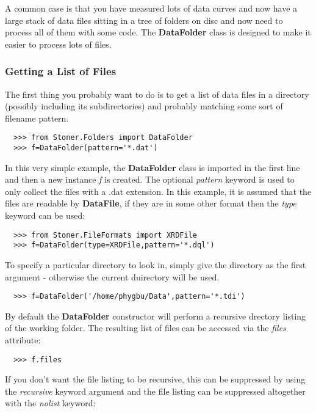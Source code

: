 \documentclass[a4paper,11pt]{scrartcl}
\begin{document}
A common case is that you have measured lots of data curves and now have a large stack of data files sitting in a tree of folders on disc and now need to process all of them with some code. The \textbf{DataFolder} class is designed to make it easier to process lots of files.

\subsubsection{Getting a List of Files}

The first thing you probably want to do is to get a list of data files in a directory (possibly including its subdirectories) and probably matching some sort of filename pattern.

\begin{verbatim}
  >>> from Stoner.Folders import DataFolder
  >>> f=DataFolder(pattern='*.dat')
\end{verbatim}

In this very simple example, the \textbf{DataFolder} class is imported in the first line and then a new instance \textit{f} is created. The optional \textit{pattern} keyword is used to only collect the files with a .dat extension. In this example, it is assumed that the files are readable by \textbf{DataFile}, if they are in some other format then the \textit{type} keyword can be used:

\begin{verbatim}
  >>> from Stoner.FileFormats import XRDFile
  >>> f=DataFolder(type=XRDFile,pattern='*.dql')
\end{verbatim}

To specify a particular directory to look in, simply give the directory as the first argument - otherwise the current duirectory will be used.

\begin{verbatim}
  >>> f=DataFolder('/home/phygbu/Data',pattern='*.tdi')
\end{verbatim}

By default the \textbf{DataFolder} constructor will perform a recursive drectory listing of the working folder. The resulting list of files can be accessed via the \textit{files} attribute:

\begin{verbatim}
  >>> f.files
\end{verbatim}

If you don't want the file listing to be recursive, this can be suppressed by using the \textit{recursive} keyword argument and the file listing can be suppressed altogether with the \textit{nolist} keyword:
\end{document}
